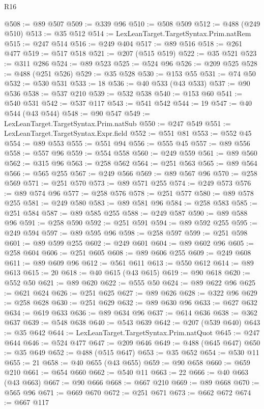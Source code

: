 \begin{lexlean}{R16}
\begin{coremodule}
@508 := @89 @507
@509 := @339 @96
@510 := @508 @509
@512 := @488 (@249 @510)
@513 := @35 @512
@514 := LexLeanTarget.TargetSyntax.Prim.natRem
@515 := @247 @514
@516 := @249 @404
@517 := @89 @516
@518 := @261 @477
@519 := @517 @518
@521 := @207 (@515 @519)
@522 := @35 @521
@523 := @311 @286
@524 := @89 @523
@525 := @524 @96
@526 := @209 @525
@528 := @488 (@251 @526)
@529 := @35 @528
@530 := @153 @55
@531 := @74 @50
@532 := @530 @531
@533 := 18
@536 := @40 @533 (@43 @533)
@537 := @90 @536
@538 := @537 @210
@539 := @532 @538
@540 := @153 @60
@541 := @540 @531
@542 := @537 @117
@543 := @541 @542
@544 := 19
@547 := @40 @544 (@43 @544)
@548 := @90 @547
@549 := LexLeanTarget.TargetSyntax.Prim.natSub
@550 := @247 @549
@551 := LexLeanTarget.TargetSyntax.Expr.field
@552 := @551 @81
@553 := @552 @45
@554 := @89 @553
@555 := @551 @94
@556 := @555 @45
@557 := @89 @556
@558 := @557 @96
@559 := @554 @558
@560 := @249 @559
@561 := @89 @560
@562 := @315 @96
@563 := @258 @562
@564 := @251 @563
@565 := @89 @564
@566 := @565 @255
@567 := @249 @566
@569 := @89 @567 @96
@570 := @258 @569
@571 := @251 @570
@573 := @89 @571 @255
@574 := @249 @573
@576 := @89 @574 @96
@577 := @258 @576
@578 := @251 @577
@580 := @89 @578 @255
@581 := @249 @580
@583 := @89 @581 @96
@584 := @258 @583
@585 := @251 @584
@587 := @89 @585 @255
@588 := @249 @587
@590 := @89 @588 @96
@591 := @258 @590
@592 := @251 @591
@594 := @89 @592 @255
@595 := @249 @594
@597 := @89 @595 @96
@598 := @258 @597
@599 := @251 @598
@601 := @89 @599 @255
@602 := @249 @601
@604 := @89 @602 @96
@605 := @258 @604
@606 := @251 @605
@608 := @89 @606 @255
@609 := @249 @608
@611 := @89 @609 @96
@612 := @561 @611
@613 := @550 @612
@614 := @89 @613
@615 := 20
@618 := @40 @615 (@43 @615)
@619 := @90 @618
@620 := @552 @50
@621 := @89 @620
@622 := @555 @50
@624 := @89 @622 @96
@625 := @621 @624
@626 := @251 @625
@627 := @89 @626
@628 := @322 @96
@629 := @258 @628
@630 := @251 @629
@632 := @89 @630 @96
@633 := @627 @632
@634 := @619 @633
@636 := @89 @634 @96
@637 := @614 @636
@638 := @362 @637
@639 := @548 @638
@640 := @543 @639
@642 := @207 (@539 @640)
@643 := @35 @642
@644 := LexLeanTarget.TargetSyntax.Prim.natQuot
@645 := @247 @644
@646 := @524 @477
@647 := @209 @646
@649 := @488 (@645 @647)
@650 := @35 @649
@652 := @488 (@515 @647)
@653 := @35 @652
@654 := @530 @11
@655 := 21
@658 := @40 @655 (@43 @655)
@659 := @90 @658
@660 := @659 @210
@661 := @654 @660
@662 := @540 @11
@663 := 22
@666 := @40 @663 (@43 @663)
@667 := @90 @666
@668 := @667 @210
@669 := @89 @668
@670 := @565 @96
@671 := @669 @670
@672 := @251 @671
@673 := @662 @672
@674 := @667 @117

\end{coremodule}
\end{lexlean}
